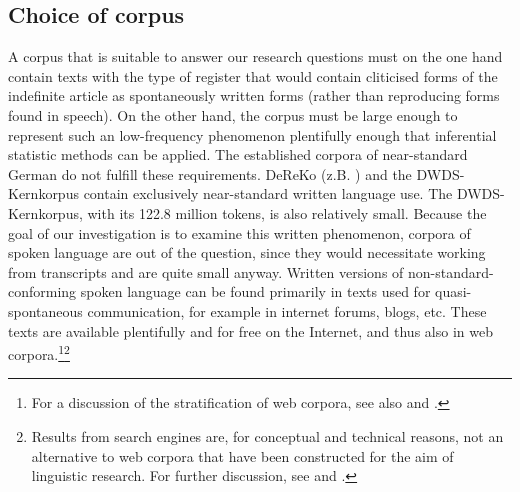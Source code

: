 \subsection{Choice of corpus}
\label{subsec:21choiceOfCorpus}

A corpus that is suitable to answer our research questions must on the one hand contain texts with the type of register that would contain cliticised forms of the indefinite article as spontaneously written forms (rather than reproducing forms found in speech).
On the other hand, the corpus must be large enough to represent such an low-frequency phenomenon plentifully enough that inferential statistic methods can be applied.
The established corpora of near-standard German do not fulfill these requirements.
DeReKo (z.B. \citealt{KupietzKeibel2009}) and the DWDS-Kernkorpus \citep{Geyken2007} contain exclusively near-standard written language use.
The DWDS-Kernkorpus, with its 122.8 million tokens, is also relatively small.
Because the goal of our investigation is to examine this written phenomenon, corpora of spoken language are out of the question, since they would necessitate working from transcripts and are quite small anyway.
Written versions of non-standard-conforming spoken language can be found primarily in texts used for quasi-spontaneous communication, for example in internet forums, blogs, etc.
These texts are available plentifully and for free on the Internet, and thus also in web corpora.\footnote{
	For a discussion of the stratification of web corpora, see also \citet[Ch. 5]{SchaeferBildhauer2013} and \citet[46]{BiemannEa2013}.}\footnote{
	Results from search engines are, for conceptual and technical reasons, not an alternative to web corpora that have been constructed for the aim of linguistic research. For further discussion, see \citealt{Kilgarriff2006} and \citealt[Ch. 1]{SchaeferBildhauer2013}.}

